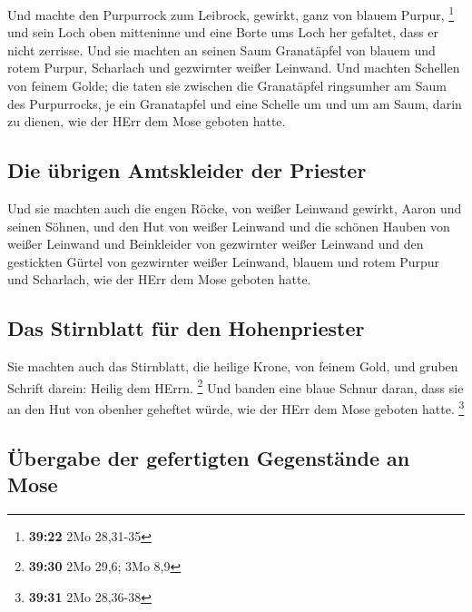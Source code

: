  Und machte den Purpurrock zum Leibrock, gewirkt, ganz
von blauem Purpur, \footnote{\textbf{39:22} 2Mo 28,31-35}
 und sein Loch oben mitteninne und eine Borte ums Loch
her gefaltet, dass er nicht zerrisse.  Und sie machten an
seinen Saum Granatäpfel von blauem und rotem Purpur, Scharlach und
gezwirnter weißer Leinwand.  Und machten Schellen von
feinem Golde; die taten sie zwischen die Granatäpfel ringsumher am Saum
des Purpurrocks,  je ein Granatapfel und eine Schelle um
und um am Saum, darin zu dienen, wie der HErr dem Mose geboten hatte.

\hypertarget{die-uxfcbrigen-amtskleider-der-priester}{%
\subsection{Die übrigen Amtskleider der
Priester}\label{die-uxfcbrigen-amtskleider-der-priester}}

 Und sie machten auch die engen Röcke, von weißer
Leinwand gewirkt, Aaron und seinen Söhnen,  und den Hut
von weißer Leinwand und die schönen Hauben von weißer Leinwand und
Beinkleider von gezwirnter weißer Leinwand  und den
gestickten Gürtel von gezwirnter weißer Leinwand, blauem und rotem
Purpur und Scharlach, wie der HErr dem Mose geboten hatte.

\hypertarget{das-stirnblatt-fuxfcr-den-hohenpriester}{%
\subsection{Das Stirnblatt für den
Hohenpriester}\label{das-stirnblatt-fuxfcr-den-hohenpriester}}

 Sie machten auch das Stirnblatt, die heilige Krone, von
feinem Gold, und gruben Schrift darein: Heilig dem HErrn. \footnote{\textbf{39:30}
  2Mo 29,6; 3Mo 8,9}  Und banden eine blaue Schnur daran,
dass sie an den Hut von obenher geheftet würde, wie der HErr dem Mose
geboten hatte. \footnote{\textbf{39:31} 2Mo 28,36-38}

\hypertarget{uxfcbergabe-der-gefertigten-gegenstuxe4nde-an-mose}{%
\subsection{Übergabe der gefertigten Gegenstände an
Mose}\label{uxfcbergabe-der-gefertigten-gegenstuxe4nde-an-mose}}

